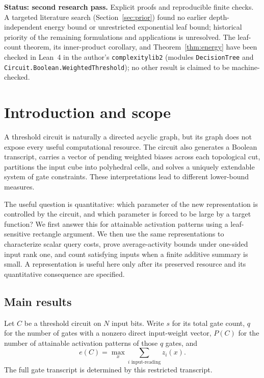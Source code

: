 \documentclass[11pt]{article}
\theoremstyle{definition}
\begin{document}
\begin{center}
\small\textbf{Status: second research pass.} Explicit proofs and reproducible finite checks.
A targeted literature search (Section~\ref{sec:prior}) found no earlier depth-independent energy bound or unrestricted exponential leaf bound; historical priority of the remaining formulations and applications is unresolved.
The leaf-count theorem, its inner-product corollary, and Theorem~\ref{thm:energy} have been checked in Lean~4 in the author's \texttt{complexitylib2} (modules \texttt{DecisionTree} and \texttt{Circuit.Boolean.WeightedThreshold}); no other result is claimed to be machine-checked.
\end{center}
\newpage
{\small\setlength{\parskip}{0pt}\tableofcontents}
\newpage

\section{Introduction and scope}
A threshold circuit is naturally a directed acyclic graph, but its graph does not expose every useful computational resource. The circuit also generates a Boolean transcript, carries a vector of pending weighted biases across each topological cut, partitions the input cube into polyhedral cells, and solves a uniquely extendable system of gate constraints. These interpretations lead to different lower-bound measures.

The useful question is quantitative: which parameter of the new representation is controlled by the circuit, and which parameter is forced to be large by a target function? We first answer this for attainable activation patterns using a leaf-sensitive rectangle argument. We then use the same representations to characterize scalar query costs, prove average-activity bounds under one-sided input rank one, and count satisfying inputs when a finite additive summary is small. A representation is useful here only after its preserved resource and its quantitative consequence are specified.

\subsection{Main results}
Let \(C\) be a threshold circuit on \(N\) input bits. Write \(s\) for its total gate count, \(q\) for the number of gates with a nonzero direct input-weight vector, \(P(C)\) for the number of attainable activation patterns of those \(q\) gates, and
\[
 e(C)=\max_x\sum_{i\text{ input-reading}}z_i(x).
\]
The full gate transcript is determined by this restricted transcript.
\end{document}
